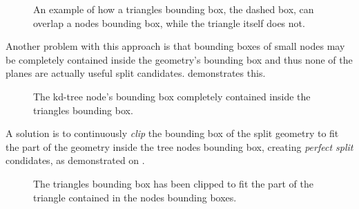 \begin{figure}
  \centering

  \vspace{3mm}
  \parbox{5cm}{\caption[Triangle/Node bounding box intersection.]{An
      example of how a triangles bounding box, the dashed box, can
      overlap a nodes bounding box, while the triangle itself does
      not.}\label{fig:aabbSplit}}
\end{figure}

Another problem with this approach is that bounding boxes of small
nodes may be completely contained inside the geometry's bounding box
and thus none of the planes are actually useful split
candidates.  demonstrates this.

\begin{figure}
  \centering
    
  \vspace{3mm}
  \parbox{5cm}{\caption[A tree node's bounding box contained in a
      triangle's bounding box.]{The kd-tree node's bounding box
      completely contained inside the triangles bounding
      box.}\label{fig:aabbContained}}
\end{figure}

A solution is to continuously \textit{clip} the bounding box of the
split geometry to fit the part of the geometry inside the tree nodes
bounding box, creating \textit{perfect split} condidates, as
demonstrated on .

\begin{figure}
  \centering

  \vspace{3mm}
  \parbox{5cm}{ \caption[Triangle clipping.]{The triangles bounding
      box has been clipped to fit the part of the triangle contained
      in the nodes bounding boxes.}\label{fig:aabbClipped}}
\end{figure}

